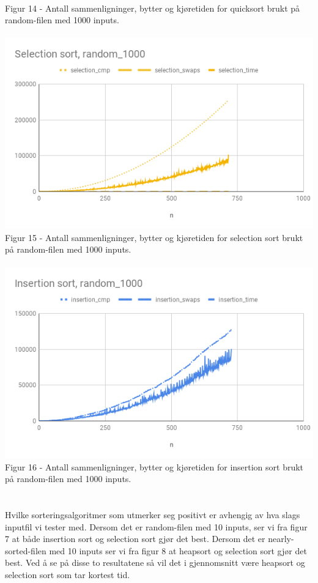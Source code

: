 \documentclass[a4paper, article, oneside, norsk]{memoir} %
\newcommand{\0}{\mathbf{0}}
\newcommand{\1}{\mathbf{1}}
\begin{document}
\\
Figur 14 - Antall sammenligninger, bytter og kjøretiden for quicksort brukt på random-filen med 1000 inputs.
\\
\\
\includegraphics[scale=0.65]{Selection sort.png}
\\
Figur 15 - Antall sammenligninger, bytter og kjøretiden for selection sort brukt på random-filen med 1000 inputs.
\\
\\
\includegraphics[scale=0.65]{Insertion sort.png}
\\
Figur 16 - Antall sammenligninger, bytter og kjøretiden for insertion sort brukt på random-filen med 1000 inputs.
\\
\\
\\
Hvilke sorteringsalgoritmer som utmerker seg positivt er avhengig av hva slags inputfil vi tester med. Dersom det er random-filen med 10 inputs, ser vi fra figur 7 at både insertion sort og selection sort gjør det best. Dersom det er nearly-sorted-filen med 10 inputs ser vi fra figur 8 at heapsort og selection sort gjør det best. Ved å se på disse to resultatene så vil det i gjennomsnitt være heapsort og selection sort som tar kortest tid.
\end{document}
